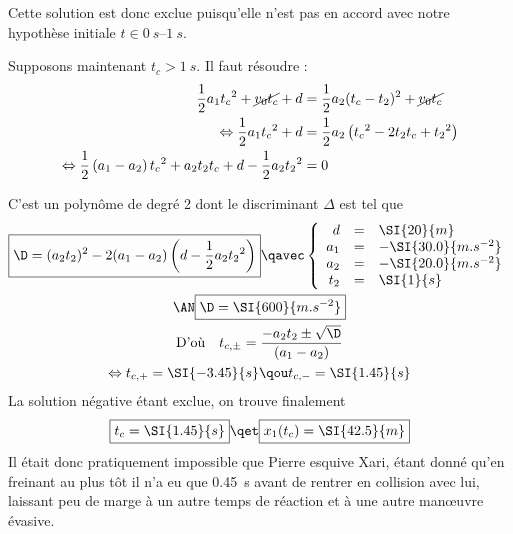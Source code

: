\documentclass[a4paper, 12pt, final, garamond]{book}
\begin{document}
\begin{enumerate}
        Cette solution est donc exclue puisqu'elle n'est pas en accord avec
        notre hypothèse initiale $t\in\SIrange{0}{1}{s}$. \bigbreak
	
	    Supposons maintenant $t_c>\SI{1}{s}$. Il faut résoudre :
        \begin{align*}
            \frac{1}{2}a_1 {t_c}^2 + \cancel{v_0t_c} + d
                &= \frac{1}{2} a_2 (t_c-t_2)^2 + \cancel{v_0t_c}
            \\
            \Leftrightarrow
            \frac{1}{2}a_1t_c{}^2 + d
                &= \frac{1}{2}a_2 \left( t_c{}^2 - 2t_2t_c + t_2{}^2\right)
            \\
            \Leftrightarrow
            \frac{1}{2} \left( a_1 - a_2 \right)t_c{}^2 + a_2t_2t_c + d -
            \frac{1}{2}a_2t_2{}^2
                &= 0
        \end{align*}

        C'est un polynôme de degré 2 dont le discriminant $\Delta$ est tel que
        \begin{gather*}
            \boxed{\D = (a_2t_2)^2 - 2(a_1-a_2)\left(d -
                \frac{1}{2}a_2t_2{}^2\right)}
            \qavec
            \left\{
                \begin{array}{rcl}
                    d & = & \SI{20}{m}\\
                    a_1 & = & -\SI{30.0}{m.s^{-2}}\\
                    a_2 & = & -\SI{20.0}{m.s^{-2}}\\
                    t_2 & = & \SI{1}{s}
                \end{array}
            \right.\\
            \AN
            \boxed{\D = \SI{600}{m.s^{-2}}}\\
            \text{D'où}\quad
            t_{c,\pm} = \frac{-a_2t_2 \pm \sqrt{\D}}{(a_1-a_2)}\\
            \Leftrightarrow
            t_{c,+} = \SI{-3.45}{s}
            \qou
            t_{c,-} = \SI{1.45}{s}
        \end{gather*}
	    La solution négative étant exclue, on trouve finalement
        \[
            \boxed{t_c = \SI{1.45}{s}}
            \qet
            \boxed{x_1(t_c) = \SI{42.5}{m}}
        \]
        Il était donc pratiquement impossible que Pierre esquive Xari, étant
        donné qu'en freinant au plus tôt il n'a eu que \SI{0.45}{s} avant de
        rentrer en collision avec lui, laissant peu de marge à un autre temps de
        réaction et à une autre manœuvre évasive.
\end{enumerate}
\end{document}

